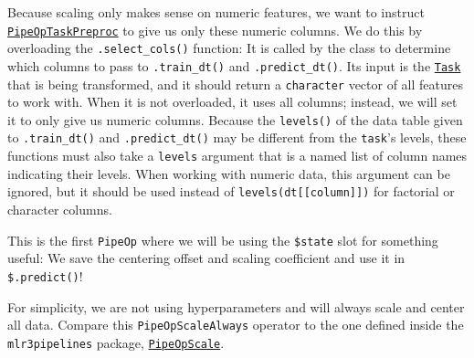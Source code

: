 \documentclass[
]{scrbook}
\begin{document}
Because scaling only makes sense on numeric features, we want to instruct \href{https://mlr3pipelines.mlr-org.com/reference/PipeOpTaskPreproc.html}{\texttt{PipeOpTaskPreproc}} to give us only these numeric columns.
We do this by overloading the \texttt{.select\_cols()} function: It is called by the class to determine which columns to pass to \texttt{.train\_dt()} and \texttt{.predict\_dt()}.
Its input is the \href{https://mlr3.mlr-org.com/reference/Task.html}{\texttt{Task}} that is being transformed, and it should return a \texttt{character} vector of all features to work with.
When it is not overloaded, it uses all columns; instead, we will set it to only give us numeric columns.
Because the \texttt{levels()} of the data table given to \texttt{.train\_dt()} and \texttt{.predict\_dt()} may be different from the \texttt{task}'s levels, these functions must also take a \texttt{levels} argument that is a named list of column names indicating their levels.
When working with numeric data, this argument can be ignored, but it should be used instead of \texttt{levels(dt{[}{[}column{]}{]})} for factorial or character columns.

This is the first \texttt{PipeOp} where we will be using the \texttt{\$state} slot for something useful: We save the centering offset and scaling coefficient and use it in \texttt{\$.predict()}!

For simplicity, we are not using hyperparameters and will always scale and center all data.
Compare this \texttt{PipeOpScaleAlways} operator to the one defined inside the \texttt{mlr3pipelines} package, \href{https://mlr3pipelines.mlr-org.com/reference/mlr_pipeops_scale.html}{\texttt{PipeOpScale}}.
\end{document}
